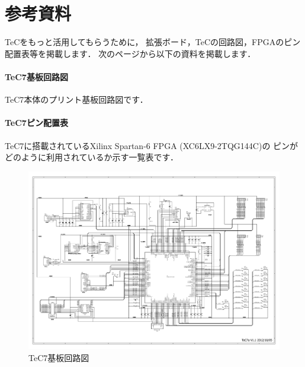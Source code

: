 \renewcommand{\myepsfbox}[1]{\epsfbox{appD/#1}}

\newpage
\onecolumn
\chapter{参考資料}

TeCをもっと活用してもらうために，
拡張ボード，TeCの回路図，FPGAのピン配置表等を掲載します．
次のページから以下の資料を掲載します．

\subsubsection{TeC7基板回路図}
TeC7本体のプリント基板回路図です．

\subsubsection{TeC7ピン配置表}
TeC7に搭載されているXilinx Spartan-6 FPGA (XC6LX9-2TQG144C)の
ピンがどのように利用されているか示す一覧表です．

\newpage
\begin{figure}[btph]
\begin{center}
\includegraphics[angle=90,width=14cm]
{appD/TeC7a.pdf}
\caption{TeC7基板回路図}
\end{center}
\end{figure}


